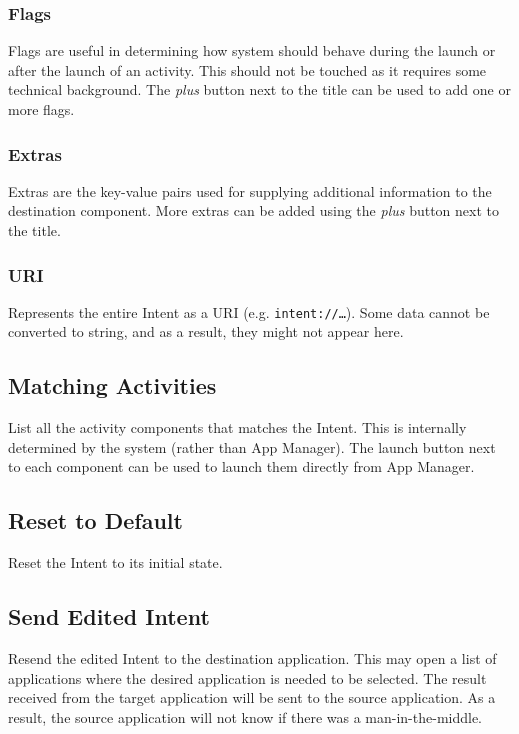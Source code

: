 \subsubsection{Flags} %
Flags are useful in determining how system should behave during the launch or after the launch of an activity.
This should not be touched as it requires some technical background. The \textit{plus} button next to the title can be used to add one or more flags.

\subsubsection{Extras} %
Extras are the key-value pairs used for supplying additional information to the destination component. More extras can be added using the \textit{plus} button next to the title.

\subsubsection{URI} %
Represents the entire Intent as a URI (e.g. \texttt{intent://\dots}). Some data cannot be converted to string,
and as a result, they might not appear here.

\subsection{Matching Activities}\label{subsec:matching-activities} %
List all the activity components that matches the Intent. This is internally determined by the system (rather than App Manager).
The launch button next to each component can be used to launch them directly from App Manager.

\subsection{Reset to Default}\label{subsec:interceptor-reset-to-default} %
Reset the Intent to its initial state.

\subsection{Send Edited Intent}\label{subsec:interceptor-send-edited-intent} %
Resend the edited Intent to the destination application. This may open a list of applications where the desired application is needed to be selected.
The result received from the target application will be sent to the source application. As a result, the source application will not know if there was a man-in-the-middle.
